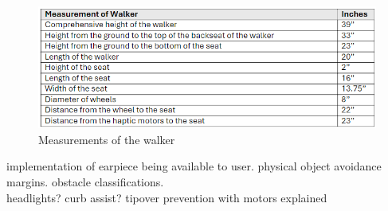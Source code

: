 \begin{figure}[H]
	\centering
	\includegraphics[width=1\textwidth]{./Images/measurements.png}
	\caption{\label{fig:Measurements_of_walker}Measurements of the walker}
\end{figure}

\noindent implementation of earpiece being available to user. physical object avoidance margins. obstacle classifications.\\

\noindent headlights? curb assist? tipover prevention with motors explained\\